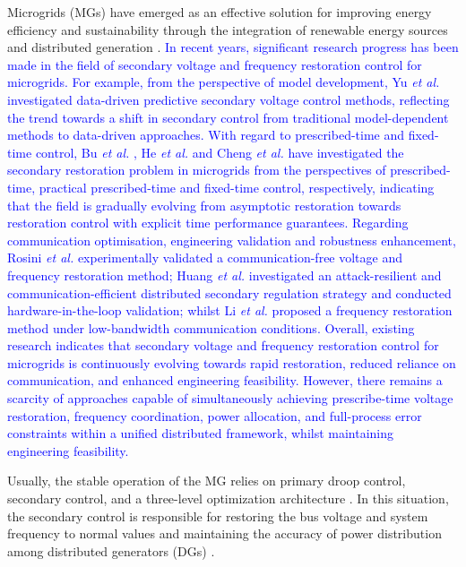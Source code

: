 \documentclass[]{interact}
\theoremstyle{plain}%
\theoremstyle{definition}
\theoremstyle{remark}
\begin{document}
Microgrids (MGs) have emerged as an effective solution for improving energy efficiency and sustainability through the integration of renewable energy sources and distributed generation \citep{Thorat2024,Guoping2024,Rosini2024,Lv2026,Chai2026}.
\textcolor{blue}{In recent years, significant research progress has been made in the field of secondary voltage and frequency restoration control for microgrids. For example, from the perspective of model development, Yu \emph{et al.} \citep{Yu2024} investigated data-driven predictive secondary voltage control methods, reflecting the trend towards a shift in secondary control from traditional model-dependent methods to data-driven approaches. With regard to prescribed-time and fixed-time control, Bu \emph{et al.} \citep{Bu2025}, He \emph{et al.} \citep{He2025} and Cheng \emph{et al.} \citep{Zhiping2023} have investigated the secondary restoration problem in microgrids from the perspectives of prescribed-time, practical prescribed-time and fixed-time control, respectively, indicating that the field is gradually evolving from asymptotic restoration towards restoration control with explicit time performance guarantees. Regarding communication optimisation, engineering validation and robustness enhancement, Rosini \emph{et al.} \citep{Rosini2024} experimentally validated a communication-free voltage and frequency restoration method; Huang \emph{et al.} \citep{Huang2026} investigated an attack-resilient and communication-efficient distributed secondary regulation strategy and conducted hardware-in-the-loop validation; whilst Li \emph{et al.} \citep{Li2026lowbw} proposed a frequency restoration method under low-bandwidth communication conditions. Overall, existing research indicates that secondary voltage and frequency restoration control for microgrids is continuously evolving towards rapid restoration, reduced reliance on communication, and enhanced engineering feasibility. However, there remains a scarcity of approaches capable of simultaneously achieving prescribe-time voltage restoration, frequency coordination, power allocation, and full-process error constraints within a unified distributed framework, whilst maintaining engineering feasibility.}
 
 Usually, the stable operation of the MG relies on primary droop control, secondary control, and a three-level optimization architecture \citep{Wang2024,Zhong2024}. In this situation, the secondary control is responsible for restoring the bus voltage and system frequency to normal values and maintaining the accuracy of power distribution among distributed generators (DGs) \citep{Jabbar2024}.
\end{document}

